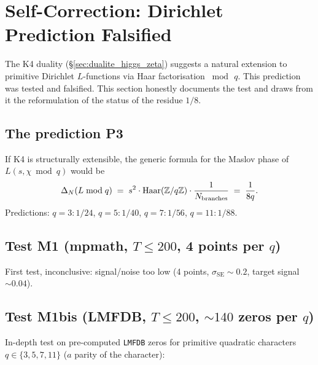 \section{Self-Correction: Dirichlet Prediction Falsified}
\label{sec:auto_correction_dirichlet}
\label{sec:auto_correction}

The K4 duality (\S\ref{sec:dualite_higgs_zeta}) suggests a natural
extension to primitive Dirichlet $L$-functions via Haar
factorisation $\bmod\,q$. This prediction was tested and falsified.
This section honestly documents the test and draws from it the
reformulation of the status of the residue $1/8$.

\subsection{The prediction P3}
\label{sec:P3}

If K4 is structurally extensible, the generic formula for the
Maslov phase of $L(s, \chi \bmod q)$ would be
\begin{equation}
\Delta_N(L \bmod q) \;=\; s^{2} \cdot \mathrm{Haar}(\mathbb{Z}/q\mathbb{Z}) \cdot \dfrac{1}{N_{\mathrm{branches}}} \;=\; \dfrac{1}{8q}.
\label{eq:P3}
\end{equation}
Predictions: $q = 3 : 1/24$, $q = 5 : 1/40$, $q = 7 : 1/56$,
$q = 11 : 1/88$.

\subsection{Test M1 (mpmath, $T \le 200$, 4 points per $q$)}
\label{sec:M1}

First test, inconclusive: signal/noise too low (4 points,
$\sigma_{\mathrm{SE}} \sim 0.2$, target signal $\sim 0.04$).

\subsection{Test M1bis (LMFDB, $T \le 200$, ${\sim} 140$ zeros per $q$)}
\label{sec:M1bis}

In-depth test on pre-computed \texttt{LMFDB} zeros for primitive
quadratic characters $q \in \{3, 5, 7, 11\}$ ($a$ parity of the
character):

